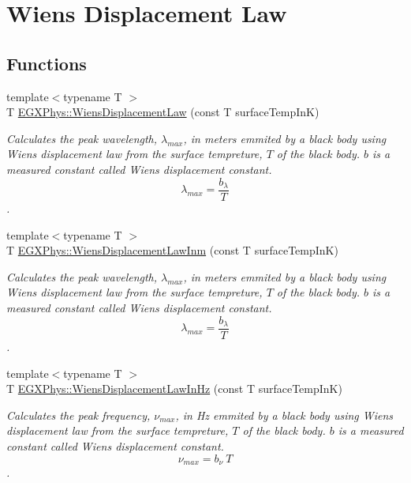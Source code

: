 \hypertarget{group___e_g_x_phys-_electrodynamics-_black_body-_wiens_displacement_law}{}\section{Wien\textquotesingle{}s Displacement Law}
\label{group___e_g_x_phys-_electrodynamics-_black_body-_wiens_displacement_law}
\subsection*{Functions}
\begin{DoxyCompactItemize}
\item 
{\footnotesize template$<$typename T $>$ }\\T \mbox{\hyperlink{group___e_g_x_phys-_electrodynamics-_black_body-_wiens_displacement_law_ga8f89ce1baac45a1717f604255d04af44}{E\+G\+X\+Phys\+::\+Wiens\+Displacement\+Law}} (const T surface\+Temp\+InK)
\begin{DoxyCompactList}\small\item\em Calculates the peak wavelength, $\lambda_{max}$, in meters emmited by a black body using Wien\textquotesingle{}s displacement law from the surface tempreture, $T$ of the black body. $b$ is a measured constant called Wien\textquotesingle{}s displacement constant. \[\lambda_{max} = \dfrac{b_\lambda}{T} \]. \end{DoxyCompactList}\item 
{\footnotesize template$<$typename T $>$ }\\T \mbox{\hyperlink{group___e_g_x_phys-_electrodynamics-_black_body-_wiens_displacement_law_ga126ebb146c31a2371f1d1d001d11c62f}{E\+G\+X\+Phys\+::\+Wiens\+Displacement\+Law\+Inm}} (const T surface\+Temp\+InK)
\begin{DoxyCompactList}\small\item\em Calculates the peak wavelength, $\lambda_{max}$, in meters emmited by a black body using Wien\textquotesingle{}s displacement law from the surface tempreture, $T$ of the black body. $b$ is a measured constant called Wien\textquotesingle{}s displacement constant. \[\lambda_{max} = \dfrac{b_\lambda}{T} \]. \end{DoxyCompactList}\item 
{\footnotesize template$<$typename T $>$ }\\T \mbox{\hyperlink{group___e_g_x_phys-_electrodynamics-_black_body-_wiens_displacement_law_gaf09ffbc9b7133c16da786c1609ecf689}{E\+G\+X\+Phys\+::\+Wiens\+Displacement\+Law\+In\+Hz}} (const T surface\+Temp\+InK)
\begin{DoxyCompactList}\small\item\em Calculates the peak frequency, $\nu_{max}$, in Hz emmited by a black body using Wien\textquotesingle{}s displacement law from the surface tempreture, $T$ of the black body. $b$ is a measured constant called Wien\textquotesingle{}s displacement constant. \[\nu_{max} = b_\nu\ T \]. \end{DoxyCompactList}\end{DoxyCompactItemize}



